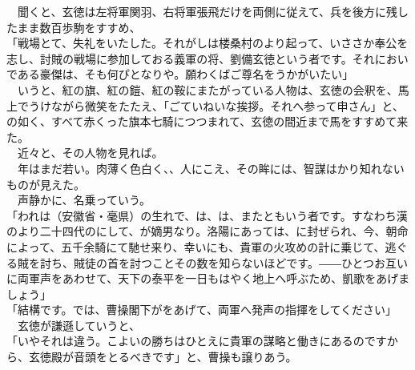 \documentclass[
  paper=a5,
  fontsize=10pt,
  jafontsize=9.5pt,
  tate,                  %
  open_bracket_pos=nibu, %
]{jlreq}
\begin{document}
　聞くと、玄徳は左将軍関羽、右将軍張飛だけを両側に従えて、兵を後方に残したまま数百歩駒をすすめ、\\


「戦場とて、失礼をいたした。それがしは楼桑村のより起って、いささか奉公を志し、討賊の戦場に参加しておる義軍の将、劉備玄徳という者です。それにおいである豪傑は、そも何ぴとなりや。願わくばご尊名をうかがいたい」\\


　いうと、紅の旗、紅の鎧、紅の鞍にまたがっている人物は、玄徳の会釈を、馬上でうけながら微笑をたたえ、「ごていねいな挨拶。それへ参って申さん」と、の如く、すべて赤くった旗本七騎につつまれて、玄徳の間近まで馬をすすめて来た。\\


　近々と、その人物を見れば。\\


　年はまだ若い。肉薄く色白く、、人にこえ、その眸には、智謀はかり知れないものが見えた。\\


　声静かに、名乗っていう。\\


「われは（安徽省・毫県）の生れで、は、は、またともいう者です。すなわち漢のより二十四代のにして、が嫡男なり。洛陽にあっては、に封ぜられ、今、朝命によって、五千余騎にて馳せ来り、幸いにも、貴軍の火攻めの計に乗じて、逃ぐる賊を討ち、賊徒の首を討つことその数を知らないほどです。――ひとつお互いに両軍声をあわせて、天下の泰平を一日もはやく地上へ呼ぶため、凱歌をあげましょう」\\


「結構です。では、曹操閣下がをあげて、両軍へ発声の指揮をしてください」\\


　玄徳が謙遜していうと、\\


「いやそれは違う。こよいの勝ちはひとえに貴軍の謀略と働きにあるのですから、玄徳殿が音頭をとるべきです」と、曹操も譲りあう。\\
\end{document}
